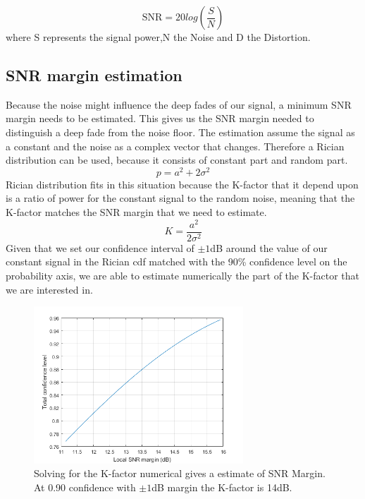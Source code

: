 \begin{equation}
\text{SNR} = 20log\left(\frac{S}{N}\right)
\end{equation}
where S represents the signal power,N the Noise and D the Distortion.\citep{SINADandSNR}
\subsection{SNR margin estimation}
\label{SNR_margin}
Because the noise might influence the deep fades of our signal, a minimum SNR margin needs to be estimated.
This gives us the SNR margin needed to distinguish a deep fade from the noise floor. %
The estimation assume the signal as a constant and the noise as a complex vector that changes. Therefore a Rician distribution can be used, because it consists of constant part and random part.
\begin{equation}
p = a^2 + 2\sigma^2
\end{equation}
Rician distribution fits in this situation because the K-factor that it depend upon is a ratio of power for the constant signal to the random noise, \citep{SpaceWirelessChan} meaning that the K-factor matches the SNR margin that we need to estimate.
\begin{equation}
K = \frac{a^2}{2\sigma^2}
\end{equation}
Given that we set our confidence interval of $\pm 1$dB around the value of our constant signal in the Rician cdf matched with the 90\% confidence level on the probability axis, we are able to estimate numerically the part of the K-factor that we are interested in.
\begin{figure}[H]
\centering
\includegraphics[width=0.70\textwidth]{figures/SNR_margin.png}
\caption{Solving for the K-factor numerical gives a estimate of SNR Margin. At 0.90 confidence with $\pm 1$dB margin  the K-factor is 14dB.}
\label{Rician_90}
\end{figure}


